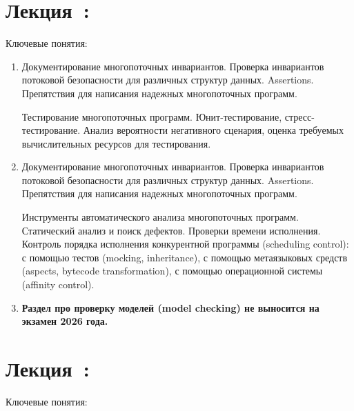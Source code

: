 \documentclass[a4paper, 12pt]{extarticle}
\begin{document}
\section{Лекция~\reliabilityNum: \reliabilityTopic}

Ключевые понятия: \reliabilityKey

\begin{enumerate}[\thesection .1]

	\item Документирование многопоточных инвариантов. Проверка инвариантов потоковой безопасности для различных структур данных.
	Assertions. Препятствия для написания надежных многопоточных программ.	 

	Тестирование многопоточных программ. Юнит-тестирование, стресс-тестирование. Анализ вероятности негативного сценария, оценка требуемых вычислительных ресурсов для тестирования.  
	
	\item Документирование многопоточных инвариантов. Проверка инвариантов потоковой безопасности для различных структур данных.
	Assertions. Препятствия для написания надежных многопоточных программ.	 

	Инструменты автоматического анализа многопоточных программ. Статический анализ и поиск дефектов. Проверки времени исполнения.
	Контроль порядка исполнения конкурентной программы (scheduling control): с помощью тестов (mocking, inheritance), с помощью метаязыковых средств (aspects, bytecode transformation), с помощью операционной системы (affinity control).

	\item \textbf{Раздел про проверку моделей (model checking) не выносится на экзамен 2026 года.}

\end{enumerate}

\section{Лекция~\foundationsNum: \foundationsTopic}

Ключевые понятия: \foundationsKey
\end{document}
